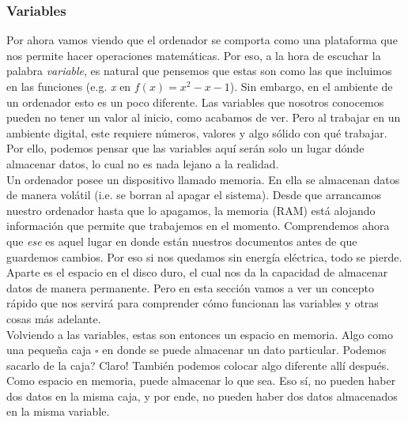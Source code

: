 \documentclass[10pt,letterpaper]{article}
\begin{document}
\subsubsection{Variables}
Por ahora vamos viendo que el ordenador se comporta como una plataforma que nos permite hacer operaciones matem\'aticas. Por eso, a la hora de escuchar la palabra \emph{variable}, es natural que pensemos que estas son como las que incluimos en las funciones (e.g. \emph{x} en $ f \left( x \right) = x^{2} - x - 1 $). Sin embargo, en el ambiente de un ordenador esto es un poco diferente. Las variables que nosotros conocemos pueden no tener un valor al inicio, como acabamos de ver. Pero al trabajar en un ambiente digital, este requiere n\'umeros, valores y algo s\'olido con qu\'e trabajar. Por ello, podemos pensar que las variables aqu\'i ser\'an solo un lugar d\'onde almacenar datos, lo cual no es nada lejano a la realidad.\\

Un ordenador posee un dispositivo llamado memoria. En ella se almacenan datos de manera vol\'atil (i.e. se borran al apagar el sistema). Desde que arrancamos nuestro ordenador hasta que lo apagamos, la memoria (RAM) est\'a alojando informaci\'on que permite que trabajemos en el momento. Comprendemos ahora que \emph{ese} es aquel lugar en donde est\'an nuestros documentos antes de que guardemos cambios. Por eso si nos quedamos sin energ\'ia el\'ectrica, todo se pierde. Aparte es el espacio en el disco duro, el cual nos da la capacidad de almacenar datos de manera permanente. Pero en esta secci\'on vamos a ver un concepto r\'apido que nos servir\'a para comprender c\'omo funcionan las variables y otras cosas m\'as adelante.\\

Volviendo a las variables, estas son entonces un espacio en memoria. Algo como una peque\~na caja $ \square $ en donde se puede almacenar un dato particular. Podemos sacarlo de la caja? Claro! Tambi\'en podemos colocar algo diferente all\'i despu\'es. Como espacio en memoria, puede almacenar lo que sea. Eso s\'i, no pueden haber dos datos en la misma caja, y por ende, no pueden haber dos datos almacenados en la misma variable.\\
\end{document}
